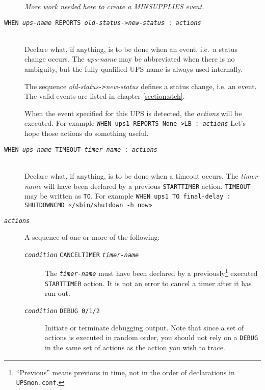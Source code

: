 \documentclass[12pt]{article}
\newcommand{\ttit}[1]{\texttt{\textit{#1}}}
\newcommand{\UPSmonconf}{\textcolor{UPSMONCOLOUR}{\texttt{UPSmon.conf}}}
\begin{document}
\begin{description}
\textit{More work needed here to create a MINSUPPLIES event.}

\item[\texttt{WHEN \textit{ups-name} REPORTS
    \textit{old-status}->\textit{new-status} : \textit{actions}}] \ \\
  Declare what, if anything, is to be done when an event, i.e.\ a
  status change occurs.  The \textit{ups-name} may be abbreviated when
  there is no ambiguity, but the fully qualified UPS name is always
  used internally.

  The sequence \textit{old-status}\texttt{->}\textit{new-status} defines a
  status change, i.e. an event.  The valid events are listed in chapter
  \ref{section:stch}.

  When the event specified for this UPS is detected, the \textit{actions} will
  be executed.  For example \texttt{WHEN ups1 REPORTS None->LB :
    \textit{actions}} Let's hope those actions do something useful.

\item[\texttt{WHEN \textit{ups-name} TIMEOUT \textit{timer-name} :
    \textit{actions}}] \ \\ Declare what, if anything, is to be done when a
  timeout occurs.  The \textit{timer-name} will have been declared by a
  previous \texttt{STARTTIMER} action.  \texttt{TIMEOUT} may be written as
  \texttt{TO}. For example \texttt{WHEN ups1 TO final-delay : SHUTDOWNCMD
    «/sbin/shutdown -h now»}

\item[\ttit{actions}]\label{item:condition} \hspace{7mm} A sequence
  of one or more of the following:

\begin{description}

\item[\ttit{condition} \texttt{CANCELTIMER}
  \ttit{timer-name}] \hspace{7mm} The \ttit{timer-name} must have been
  declared by a previously\footnote{``Previous'' means previous in
  time, not in the order of declarations in \UPSmonconf.}  executed
  \texttt{STARTTIMER} action.  It is not an error to cancel a timer
  after it has run out.

\item[\ttit{condition} \texttt{DEBUG 0/1/2}] \hspace{7mm} Initiate or terminate
debugging output.  Note that since a set of actions is executed in random
order, you should not rely on a \texttt{DEBUG} in the same set of actions as
the action you wish to trace.


\end{description}
\end{description}
\end{document}
